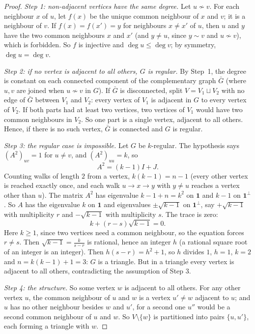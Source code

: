 \begin{proof}
\emph{Step 1: non-adjacent vertices have the same degree.} Let $u\not\sim v$. For each neighbour $x$ of $u$, let $f(x)$ be the
unique common neighbour of $x$ and $v$; it is a neighbour of $v$. If $f(x)=f(x')=y$ for neighbours $x\ne x'$ of $u$, then $u$ and
$y$ have the two common neighbours $x$ and $x'$ (and $y\ne u$, since $y\sim v$ and $u\not\sim v$), which is forbidden. So $f$ is
injective and $\deg u\le\deg v$; by symmetry, $\deg u=\deg v$.

\emph{Step 2: if no vertex is adjacent to all others, $G$ is regular.} By Step~1, the degree is constant on each connected component
of the complementary graph $\bar G$ (where $u,v$ are joined when $u\not\sim v$ in $G$). If $\bar G$ is disconnected, split $V=V_1\sqcup
V_2$ with no edge of $\bar G$ between $V_1$ and $V_2$: every vertex of $V_1$ is adjacent in $G$ to every vertex of $V_2$. If both parts
had at least two vertices, two vertices of $V_1$ would have two common neighbours in $V_2$. So one part is a single vertex, adjacent
to all others. Hence, if there is no such vertex, $\bar G$ is connected and $G$ is regular.

\emph{Step 3: the regular case is impossible.} Let $G$ be $k$-regular. The hypothesis says $(A^2)_{uv}=1$ for $u\ne v$, and
$(A^2)_{uu}=k$, so
\[
A^2=(k-1)I+J.
\]
Counting walks of length $2$ from a vertex, $k(k-1)=n-1$ (every other vertex is reached exactly once, and each walk
$u\to x\to y$ with $y\ne u$ reaches a vertex other than $u$). The matrix $A^2$ has eigenvalue $k-1+n=k^2$ on $\mathbf 1$ and $k-1$ on
$\mathbf 1^\perp$. So $A$ has the eigenvalue $k$ on $\mathbf 1$ and eigenvalues $\pm\sqrt{k-1}$ on $\mathbf 1^\perp$, say $+\sqrt{k-1}$
with multiplicity $r$ and $-\sqrt{k-1}$ with multiplicity $s$. The trace is zero:
\[
k+(r-s)\sqrt{k-1}=0.
\]
Here $k\ge1$, since two vertices need a common neighbour, so the equation forces $r\ne s$. Then
$\sqrt{k-1}=\frac k{s-r}$ is rational, hence an integer $h$ (a rational square root of an integer is an integer). Then $h(s-r)=h^2+1$,
so $h$ divides $1$, $h=1$, $k=2$ and $n=k(k-1)+1=3$: $G$ is a triangle. But in a triangle every vertex is adjacent to all others,
contradicting the assumption of Step 3.

\emph{Step 4: the structure.} So some vertex $w$ is adjacent to all others. For any other vertex $u$, the common neighbour of $u$
and $w$ is a vertex $u'\ne w$ adjacent to $u$; and $u$ has no other neighbour besides $w$ and $u'$, for a second one $u''$ would be
a second common neighbour of $u$ and $w$. So $V\setminus\{w\}$ is partitioned into pairs $\{u,u'\}$, each forming a triangle with $w$.
\end{proof}

